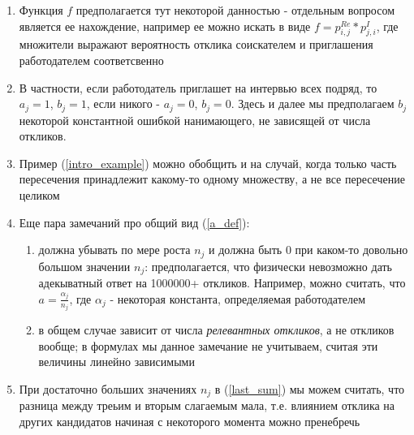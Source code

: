 \documentclass[twocolumn]{article}
\begin{document}
    \begin{enumerate}
        \item Функция $f$ предполагается тут некоторой данностью - отдельным вопросом является ее нахождение, например ее можно искать в виде $f = p^{Re}_{i,j} * p^{I}_{j,i}$, где множители выражают вероятность отклика соискателем и приглашения работодателем соответсвенно
        \item В частности, если работодатель приглашет на интервью всех подряд, то $a_j = 1$, $b_j = 1$, если никого - $a_j = 0$, $b_j = 0$. Здесь и далее мы предполагаем $b_j$ некоторой константной ошибкой нанимающего, не зависящей от числа откликов.
        \item Пример (\ref{intro_example}) можно обобщить и на случай, когда только часть пересечения принадлежит какому-то одному множеству, а не все пересечение целиком
        \item Еще пара замечаний про общий вид (\ref{a_def}):
        \begin{enumerate}
            \item должна убывать по мере роста $n_j$ и должна быть 0 при каком-то довольно большом значении $n_j$: предполагается, что физически невозможно дать адекыватный ответ на 1000000+ откликов. Например, можно считать, что $a = \frac{\alpha_j}{n_j}$, где  $\alpha_j$ - некоторая константа, определяемая работодателем
            \item в общем случае зависит от числа \textit{релевантных откликов}, а не откликов вообще; в формулах мы данное замечание не учитываем, считая эти величины линейно зависимыми
        \end{enumerate}
        \item При достаточно больших значениях $n_j$ в (\ref{last_sum}) мы можем считать, что разница между треьим и вторым слагаемым мала, т.е. влиянием отклика на других кандидатов начиная с некоторого момента можно пренебречь
    \end{enumerate}
\end{document}

